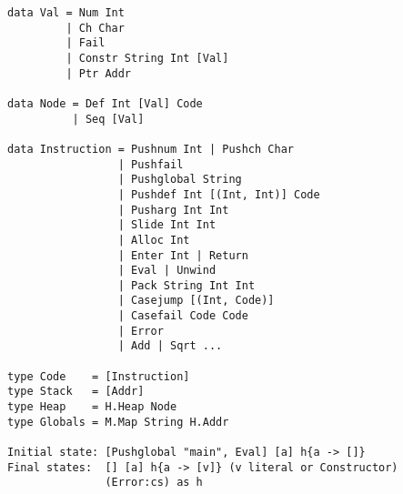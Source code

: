 \documentclass[10pt, a4paper]{article}
\begin{document}
\itshape


\begin{verbatim}
data Val = Num Int
         | Ch Char
         | Fail
         | Constr String Int [Val]
         | Ptr Addr

data Node = Def Int [Val] Code
          | Seq [Val]

data Instruction = Pushnum Int | Pushch Char
                 | Pushfail
                 | Pushglobal String
                 | Pushdef Int [(Int, Int)] Code
                 | Pusharg Int Int
                 | Slide Int Int
                 | Alloc Int
                 | Enter Int | Return
                 | Eval | Unwind
                 | Pack String Int Int
                 | Casejump [(Int, Code)]
                 | Casefail Code Code
                 | Error
                 | Add | Sqrt ...

type Code    = [Instruction]
type Stack   = [Addr]
type Heap    = H.Heap Node
type Globals = M.Map String H.Addr

Initial state: [Pushglobal "main", Eval] [a] h{a -> []}
Final states:  [] [a] h{a -> [v]} (v literal or Constructor)
               (Error:cs) as h
\end{verbatim}

~
\end{document}
